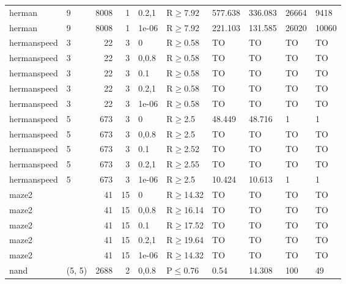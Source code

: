 \begin{longtable}{llrrllllll}
 herman        & 9         &   	8008 &   1 & 0.2,1 & R$\geq$7.92  & 577.638  & 336.083  & 26664   & 9418   \\
 herman        & 9         &   	8008 &   1 & 1e-06 & R$\geq$7.92  & 221.103  & 131.585  & 26020   & 10060  \\
 hermanspeed   & 3         &     	22 &   3 & 0     & R$\geq$0.58  & TO       & TO       & TO      & TO     \\
 hermanspeed   & 3         &     	22 &   3 & 0,0.8 & R$\geq$0.58  & TO       & TO       & TO      & TO     \\
 hermanspeed   & 3         &     	22 &   3 & 0.1   & R$\geq$0.58  & TO       & TO       & TO      & TO     \\
 hermanspeed   & 3         &     	22 &   3 & 0.2,1 & R$\geq$0.58  & TO       & TO       & TO      & TO     \\
 hermanspeed   & 3         &     	22 &   3 & 1e-06 & R$\geq$0.58  & TO       & TO       & TO      & TO     \\
 hermanspeed   & 5         &    	673 &   3 & 0     & R$\geq$2.5   & 48.449   & 48.716   & 1       & 1      \\
 hermanspeed   & 5         &    	673 &   3 & 0,0.8 & R$\geq$2.5   & TO       & TO       & TO      & TO     \\
 hermanspeed   & 5         &    	673 &   3 & 0.1   & R$\geq$2.52  & TO       & TO       & TO      & TO     \\
 hermanspeed   & 5         &    	673 &   3 & 0.2,1 & R$\geq$2.55  & TO       & TO       & TO      & TO     \\
 hermanspeed   & 5         &    	673 &   3 & 1e-06 & R$\geq$2.5   & 10.424   & 10.613   & 1       & 1      \\
 maze2         &           &     	41 &  15 & 0     & R$\geq$14.32 & TO       & TO       & TO      & TO     \\
 maze2         &           &     	41 &  15 & 0,0.8 & R$\geq$16.14 & TO       & TO       & TO      & TO     \\
 maze2         &           &     	41 &  15 & 0.1   & R$\geq$17.52 & TO       & TO       & TO      & TO     \\
 maze2         &           &     	41 &  15 & 0.2,1 & R$\geq$19.64 & TO       & TO       & TO      & TO     \\
 maze2         &           &     	41 &  15 & 1e-06 & R$\geq$14.32 & TO       & TO       & TO      & TO     \\
 nand          & (5, 5)    &   	2688 &   2 & 0,0.8 & P$\leq$0.76  & 0.54     & 14.308   & 100     & 49     \\

\end{longtable}

